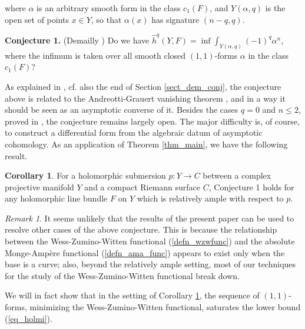 \documentclass[12pt]{article}
\numberwithin{equation}{section}
\theoremstyle{theorem}
\theoremstyle{definition}
\newtheorem{cor}[thm]{Corollary}
\theoremstyle{remark}
\newtheorem{rem}[thm]{Remark}
\begin{document}
	where $\alpha$ is an arbitrary smooth form in the class $c_1(F)$, and $Y(\alpha, q)$ is the open set of points $x \in Y$, so that $\alpha(x)$ has signature $(n - q, q)$.
	\vspace*{0.3cm}
	\par 
	\noindent \textbf{Conjecture 1.} (Demailly \cite[Question 1.13]{DemaillyRiemannHOLM})
	Do we have $\hat{h}^q(Y, F) = \inf \int_{Y(\alpha, q)} (-1)^q \alpha^n$, where the infimum is taken over all smooth closed $(1, 1)$-forms $\alpha$ in the class $c_1(F)$?
	\vspace*{0.3cm}
	\par 
	As explained in \cite[p. 3]{DemAndrGrau}, cf. also the end of Section \ref{sect_dem_conj}, the conjecture above is related to the Andreotti-Grauert vanishing theorem \cite{AndrGrauert}, and in a way it should be seen as an asymptotic converse of it.
	Besides the cases $q = 0$ and $n \leq 2$, proved in \cite[Theorems 1.3, 1.4]{DemAndrGrau}, the conjecture remains largely open.
	The major difficulty is, of course, to construct a differential form from the algebraic datum of asymptotic cohomology.
	As an application of Theorem \ref{thm_main}, we have the following result.
	\begin{cor}\label{thm_andgr}
		For a holomorphic submersion $p : Y \to C$ between a complex projective manifold $Y$ and a compact Riemann surface $C$, Conjecture 1 holds for any holomorphic line bundle $F$ on $Y$ which is relatively ample with respect to $p$.
	\end{cor}
	\begin{rem}
		It seems unlikely that the results of the present paper can be used to resolve other cases of the above conjecture. 
		This is because the relationship between the Wess-Zumino-Witten functional (\ref{defn_wzwfunc}) and the absolute Monge-Ampère functional (\ref{defn_ama_func}) appears to exist only when the base is a curve; also, beyond the relatively ample setting, most of our techniques for the study of the Wess-Zumino-Witten functional break down.
	\end{rem}
	We will in fact show that in the setting of Corollary \ref{thm_andgr}, the sequence of $(1, 1)$-forms, minimizing the Wess-Zumino-Witten functional, saturates the lower bound (\ref{eq_holmi}).

\end{document}
